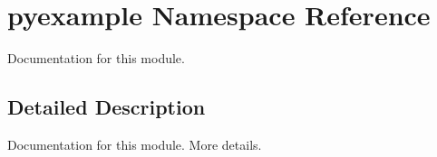 \hypertarget{namespacepyexample}{\section{pyexample Namespace Reference}
\label{namespacepyexample}
}


Documentation for this module.  




\subsection{Detailed Description}
Documentation for this module. More details. 